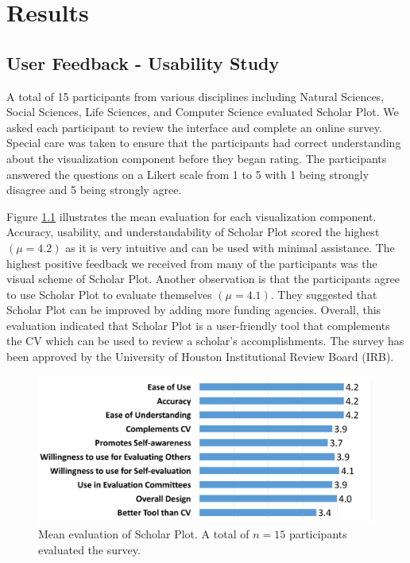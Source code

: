 \chapter{Results}\label{chap:Results}

\section{User Feedback - Usability Study}



A total of 15 participants from various disciplines including Natural Sciences, Social Sciences, Life Sciences, and Computer Science evaluated Scholar Plot. We asked each participant to review the interface and complete an online survey. Special care was taken to ensure that the participants had correct understanding about the visualization component before they began rating. The participants answered the questions on a Likert scale from 1 to 5 with 1 being strongly disagree and 5 being strongly agree.

Figure \ref{fig:UserStudy} illustrates the mean evaluation for each visualization component. Accuracy, usability, and understandability of Scholar Plot scored the highest $(\mu = 4.2)$ as it is very intuitive and can be used with minimal assistance. The highest positive feedback we received from many of the participants was the visual scheme of Scholar Plot. Another observation is that the participants agree to use Scholar Plot to evaluate themselves $(\mu = 4.1)$. They suggested that Scholar Plot can be improved by adding more funding agencies. Overall, this evaluation indicated that Scholar Plot is a user-friendly tool that complements the CV which can be used to review a scholar's accomplishments. The survey has been approved by the University of Houston Institutional Review Board (IRB).

 \begin{figure}[!htb]
  \centering
  \includegraphics[width=\textwidth]{figures/fig_survey_chart}
  \caption{Mean evaluation of Scholar Plot. A total of $n=15$ participants evaluated the survey.}
  \label{fig:UserStudy}
\end{figure}



